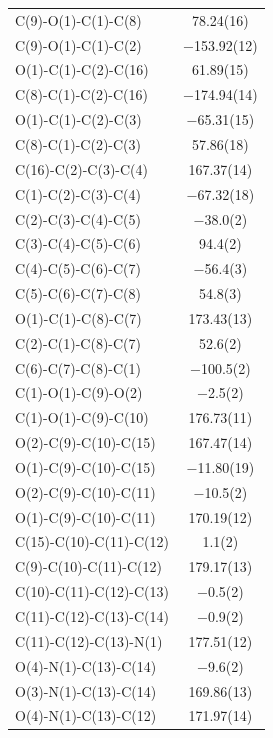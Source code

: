 \begin{center}
\tablefirsthead{%
\toprule}
\tablelasttail{\bottomrule}
{\footnotesize \singlespacing
\begin{supertabular}{p{1.5in}c}
C(9)-O(1)-C(1)-C(8)&78.24(16)\\
C(9)-O(1)-C(1)-C(2)&$-$153.92(12)\\
O(1)-C(1)-C(2)-C(16)&61.89(15)\\
C(8)-C(1)-C(2)-C(16)&$-$174.94(14)\\
O(1)-C(1)-C(2)-C(3)&$-$65.31(15)\\
C(8)-C(1)-C(2)-C(3)&57.86(18)\\
C(16)-C(2)-C(3)-C(4)&167.37(14)\\
C(1)-C(2)-C(3)-C(4)&$-$67.32(18)\\
C(2)-C(3)-C(4)-C(5)&$-$38.0(2)\\
C(3)-C(4)-C(5)-C(6)&94.4(2)\\
C(4)-C(5)-C(6)-C(7)&$-$56.4(3)\\
C(5)-C(6)-C(7)-C(8)&54.8(3)\\
O(1)-C(1)-C(8)-C(7)&173.43(13)\\
C(2)-C(1)-C(8)-C(7)&52.6(2)\\
C(6)-C(7)-C(8)-C(1)&$-$100.5(2)\\
C(1)-O(1)-C(9)-O(2)&$-$2.5(2)\\
C(1)-O(1)-C(9)-C(10)&176.73(11)\\
O(2)-C(9)-C(10)-C(15)&167.47(14)\\
O(1)-C(9)-C(10)-C(15)&$-$11.80(19)\\
O(2)-C(9)-C(10)-C(11)&$-$10.5(2)\\
O(1)-C(9)-C(10)-C(11)&170.19(12)\\
C(15)-C(10)-C(11)-C(12)&1.1(2)\\
C(9)-C(10)-C(11)-C(12)&179.17(13)\\
C(10)-C(11)-C(12)-C(13)&$-$0.5(2)\\
C(11)-C(12)-C(13)-C(14)&$-$0.9(2)\\
C(11)-C(12)-C(13)-N(1)&177.51(12)\\
O(4)-N(1)-C(13)-C(14)&$-$9.6(2)\\
O(3)-N(1)-C(13)-C(14)&169.86(13)\\
O(4)-N(1)-C(13)-C(12)&171.97(14)\\

\end{supertabular}}
\end{center}
